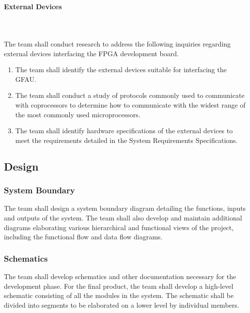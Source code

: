 \documentclass[12pt]{extarticle}
\begin{document}
                \paragraph{External Devices} \leavevmode \\~\\ The team shall
                conduct research to address the following inquiries regarding
                external devices interfacing the FPGA development board.

                \begin{enumerate}
                    \item The team shall identify the external devices suitable
                    for interfacing the GFAU.
                    \item The team shall conduct a study of protocols commonly
                    used to communicate with coprocessors to determine how to
                    communicate with the widest range of the most commonly used
                    microprocessors.
                    \item The team shall identify hardware specifications of
                    the external devices to meet the requirements detailed in
                    the System Requirements Specifications.
                \end{enumerate}

        \subsection{Design}

            \subsubsection{System Boundary} The team shall design a system
            boundary diagram detailing the functions, inputs and outputs of the
            system. The team shall also develop and maintain additional
            diagrams elaborating various hierarchical and functional views of
            the project, including the functional flow and data flow diagrams.

            \subsubsection{Schematics} The team shall develop 
            schematics and other documentation necessary for the development
            phase. For the final product, the team shall develop a high-level
            schematic consisting of all the modules in the system. The
            schematic shall be divided into segments to be elaborated on a
            lower level by individual members.
            
\end{document}
